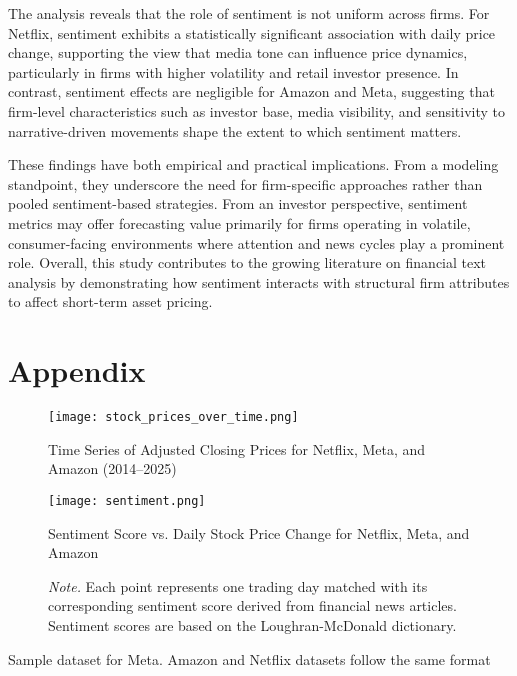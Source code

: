 \documentclass[12pt]{article}
\begin{document}
The analysis reveals that the role of sentiment is not uniform across firms. For Netflix, sentiment exhibits a statistically significant association with daily price change, supporting the view that media tone can influence price dynamics, particularly in firms with higher volatility and retail investor presence. In contrast, sentiment effects are negligible for Amazon and Meta, suggesting that firm-level characteristics such as investor base, media visibility, and sensitivity to narrative-driven movements shape the extent to which sentiment matters.

These findings have both empirical and practical implications. From a modeling standpoint, they underscore the need for firm-specific approaches rather than pooled sentiment-based strategies. From an investor perspective, sentiment metrics may offer forecasting value primarily for firms operating in volatile, consumer-facing environments where attention and news cycles play a prominent role. Overall, this study contributes to the growing literature on financial text analysis by demonstrating how sentiment interacts with structural firm attributes to affect short-term asset pricing.

\newpage



\newpage
\section{Appendix}
\label{sec:appendix}

\begin{figure}[H]
    \centering
    \texttt{[image: stock\_prices\_over\_time.png]}
    \caption{Time Series of Adjusted Closing Prices for Netflix, Meta, and Amazon (2014–2025)}
    \label{fig:figure1} 
\end{figure}

\begin{figure}[H]
    \centering
    \texttt{[image: sentiment.png]}
    \caption{Sentiment Score vs. Daily Stock Price Change for Netflix, Meta, and Amazon}
    \caption*{\textit{Note.} Each point represents one trading day matched with its corresponding sentiment score derived from financial news articles. Sentiment scores are based on the Loughran-McDonald dictionary.}
    \label{fig:figure2}
\end{figure}

\begin{table}[htbp]
\centering

\caption{Sample dataset for Meta. Amazon and Netflix datasets follow the same format}
\label{tab:meta_sample}
\end{table}
\end{document}
